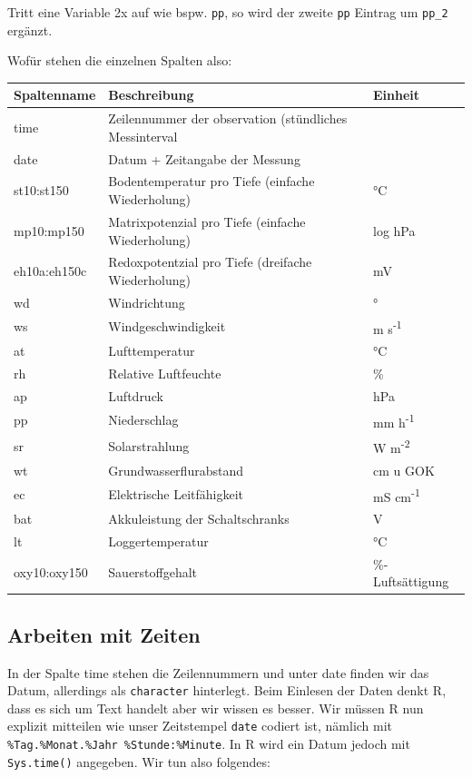 \documentclass[
]{article}
\begin{document}
Tritt eine Variable 2x auf wie bspw. \texttt{pp}, so wird der zweite \texttt{pp} Eintrag um \texttt{pp\_2} ergänzt.

Wofür stehen die einzelnen Spalten also:

\begin{longtable}[]{@{}lll@{}}
\toprule
Spaltenname & Beschreibung & Einheit \\
\midrule
\endhead
time & Zeilennummer der observation (stündliches Messinterval & \\
date & Datum + Zeitangabe der Messung & \\
st10:st150 & Bodentemperatur pro Tiefe (einfache Wiederholung) & °C \\
mp10:mp150 & Matrixpotenzial pro Tiefe (einfache Wiederholung) & log hPa \\
eh10a:eh150c & Redoxpotentzial pro Tiefe (dreifache Wiederholung) & mV \\
wd & Windrichtung & ° \\
ws & Windgeschwindigkeit & m s\textsuperscript{-1} \\
at & Lufttemperatur & °C \\
rh & Relative Luftfeuchte & \% \\
ap & Luftdruck & hPa \\
pp & Niederschlag & mm h\textsuperscript{-1} \\
sr & Solarstrahlung & W m\textsuperscript{-2} \\
wt & Grundwasserflurabstand & cm u GOK \\
ec & Elektrische Leitfähigkeit & mS cm\textsuperscript{-1} \\
bat & Akkuleistung der Schaltschranks & V \\
lt & Loggertemperatur & °C \\
oxy10:oxy150 & Sauerstoffgehalt & \%-Luftsättigung \\
\bottomrule
\end{longtable}

\hypertarget{arbeiten-mit-zeiten}{%
\subsection{Arbeiten mit Zeiten}\label{arbeiten-mit-zeiten}}

In der Spalte time stehen die Zeilennummern und unter date finden wir das Datum, allerdings als \texttt{character} hinterlegt. Beim Einlesen der Daten denkt R, dass es sich um Text handelt aber wir wissen es besser. Wir müssen R nun explizit mitteilen wie unser Zeitstempel \texttt{date} codiert ist, nämlich mit \texttt{\%Tag.\%Monat.\%Jahr\ \%Stunde:\%Minute}. In R wird ein Datum jedoch mit \texttt{Sys.time()} angegeben. Wir tun also folgendes:
\end{document}
